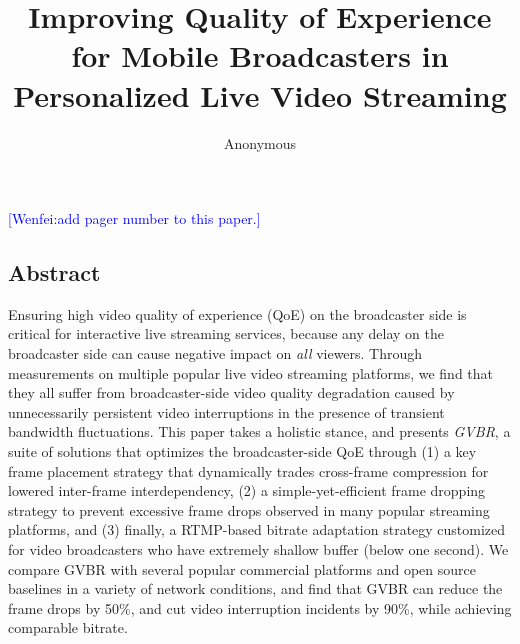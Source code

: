 \documentclass[conference]{IEEEtran}
\newcommand{\wenfei}[1]{\textcolor{blue}{[Wenfei:#1]}}
\newcommand{\wenfei}[1]{}
\begin{document}


\title{Improving Quality of Experience for Mobile Broadcasters in Personalized Live Video Streaming}

\author{Anonymous}

\maketitle



\wenfei{add pager number to this paper.}
\subsection*{Abstract}
Ensuring high video quality of experience (QoE) on the broadcaster side is 
critical for interactive live streaming services, because any delay on the 
broadcaster side can cause negative impact on {\em all} viewers. Through 
measurements on multiple popular live video streaming platforms, we find 
that they all suffer from broadcaster-side video quality degradation caused 
by unnecessarily persistent video interruptions in the presence of transient 
bandwidth fluctuations. This paper takes a holistic stance, and presents 
{\em GVBR}, a suite of solutions that optimizes the broadcaster-side QoE 
through (1) a key frame placement strategy that dynamically trades 
cross-frame compression for lowered inter-frame interdependency, (2) a 
simple-yet-efficient frame dropping strategy to prevent excessive frame 
drops observed in many popular streaming platforms, and (3) finally, a
RTMP-based bitrate adaptation strategy customized for video broadcasters 
who have extremely shallow buffer (below one second).
We compare GVBR with several popular commercial platforms and open source 
baselines in a variety of network conditions, and find that GVBR can reduce 
the frame drops by 50\%, and cut video interruption incidents by 90\%, while 
achieving comparable bitrate.




%










\begin{small}

\end{small}
\label{last-page}
\end{document}

